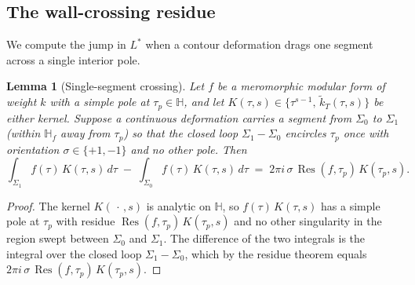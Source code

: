 \documentclass[11pt]{article}
\newtheorem{lemma}[theorem]{Lemma}
\numberwithin{equation}{section}  %
\newcommand{\HH}{\mathbb{H}}
\DeclareMathOperator{\Res}{Res}
\begin{document}
\subsection{The wall-crossing residue}\label{subsec:wall-crossing}

We compute the jump in $L^*$ when a contour deformation drags one
segment across a single interior pole.

\begin{lemma}[Single-segment crossing]\label{lem:segment-crossing}
Let $f$ be a meromorphic modular form of weight $k$ with a simple pole
at $\tau_p \in \HH$, and let
$K(\tau, s) \in \{\tau^{s-1},\, \widetilde{k}_T(\tau, s)\}$ be either
kernel.  Suppose a continuous deformation carries a segment from
$\Sigma_0$ to $\Sigma_1$ (within $\HH_f$ away from $\tau_p$) so that
the closed loop $\Sigma_1 - \Sigma_0$ encircles $\tau_p$ once with
orientation $\sigma \in \{+1, -1\}$ and no other pole.  Then
\begin{equation}\label{eq:segment-crossing}
  \int_{\Sigma_1}\! f(\tau)\,K(\tau, s)\,d\tau
  \;-\; \int_{\Sigma_0}\! f(\tau)\,K(\tau, s)\,d\tau
  \;=\; 2\pi i\,\sigma\,\Res(f, \tau_p)\,K(\tau_p, s).
\end{equation}
\end{lemma}
\begin{proof}
The kernel $K(\,\cdot\,, s)$ is analytic on $\HH$, so
$f(\tau)\,K(\tau, s)$ has a simple pole at $\tau_p$ with residue
$\Res(f, \tau_p)\,K(\tau_p, s)$ and no other singularity in the region
swept between $\Sigma_0$ and $\Sigma_1$.  The difference of the two
integrals is the integral over the closed loop $\Sigma_1 - \Sigma_0$,
which by the residue theorem equals
$2\pi i\,\sigma\,\Res(f, \tau_p)\,K(\tau_p, s)$.
\end{proof}
\end{document}
